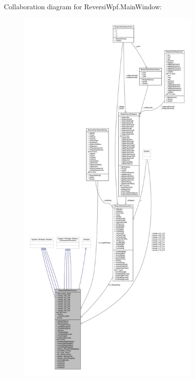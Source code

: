 Collaboration diagram for Reversi\+Wpf.\+Main\+Window\+:
\nopagebreak
\begin{figure}[H]
\begin{center}
\leavevmode
\includegraphics[height=550pt]{class_reversi_wpf_1_1_main_window__coll__graph}
\end{center}
\end{figure}
